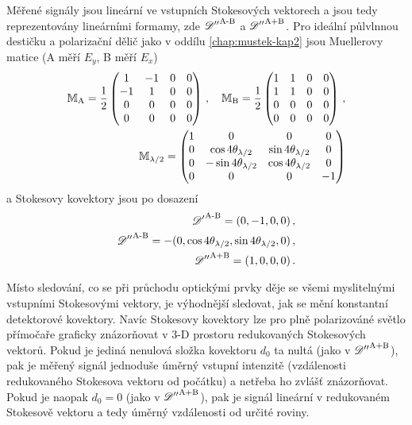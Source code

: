Měřené signály jsou lineární ve vstupních Stokesových vektorech a jsou tedy reprezentovány lineárními formamy, zde ${\mathscr{D}''}^\textrm{A-B}$ a ${\mathscr{D}''}^\textrm{A+B}$.
Pro ideální půlvlnnou destičku a polarizační dělič jako v oddílu \ref{chap:mustek-kap2} jsou Muellerovy matice (A měří $E_y$, B měří $E_x$)
\begin{align}
    \mathbb{M}_\textrm{A} = \frac{1}{2}\begin{pmatrix} 1&-1&0&0 \\ -1&1&0&0 \\ 0&0&0&0 \\ 0&0&0&0 \end{pmatrix} \,,\quad 
    \mathbb{M}_\textrm{B} = \frac{1}{2}\begin{pmatrix} 1&1&0&0 \\ 1&1&0&0 \\ 0&0&0&0 \\ 0&0&0&0 \end{pmatrix} \,, \\
    \mathbb{M}_{\lambda/2} = \begin{pmatrix} 1&0&0&0 \\ 0&\cos4\theta_{\lambda/2}&\sin4\theta_{\lambda/2}&0 \\ 0&-\sin4\theta_{\lambda/2}&\cos4\theta_{\lambda/2}&0 \\ 0&0&0&-1 \end{pmatrix}
\end{align}
a Stokesovy kovektory jsou po dosazení
\begin{align}
    {\mathscr{D}'}^\textrm{A-B}=(0, -1, 0, 0) \,, \\
    {\mathscr{D}''}^\textrm{A-B}=-(0, \cos4\theta_{\lambda/2}, \sin4\theta_{\lambda/2}, 0) \,, \label{eqn:Uab-Mueller} \\
    {\mathscr{D}''}^\textrm{A+B}=(1, 0, 0, 0) \,.
\end{align}

Místo sledování, co se při průchodu optickými prvky děje se všemi myslitelnými vstupními Stokesovými vektory, je výhodnější sledovat, jak se mění konstantní detektorové kovektory.
Navíc Stokesovy kovektory lze pro plně polarizováné světlo přímočaře graficky znázorňovat v 3-D prostoru redukovaných Stokesových vektorů.
Pokud je jediná nenulová složka kovektoru $d_0$ ta nultá (jako v ${\mathscr{D}''}^\textrm{A+B}$), pak je měřený signál jednoduše úměrný vstupní intenzitě (vzdálenosti redukovaného Stokesova vektoru od počátku) a netřeba ho zvlášť znázorňovat.
Pokud je naopak $d_0=0$ (jako v ${\mathscr{D}''}^\textrm{A+B}$), pak je signál lineární v redukovaném Stokesově vektoru a tedy úměrný vzdálenosti od určité roviny.

